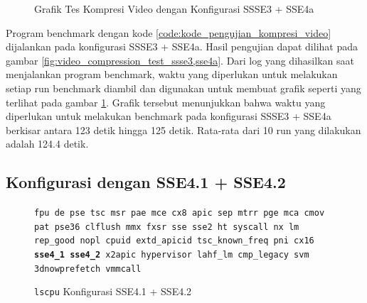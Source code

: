 \begin{figure}
    \centering
    \caption{Grafik Tes Kompresi Video dengan Konfigurasi SSSE3 + SSE4a}
    \label{fig:video_compression_test_ssse3,sse4a_graph}
\end{figure}

Program benchmark dengan kode \ref{code:kode_pengujian_kompresi_video} dijalankan pada konfigurasi SSSE3 + SSE4a. Hasil pengujian dapat dilihat pada gambar \ref{fig:video_compression_test_ssse3,sse4a}. Dari log yang dihasilkan saat menjalankan program benchmark, waktu yang diperlukan untuk melakukan setiap run benchmark diambil dan digunakan untuk membuat grafik seperti yang terlihat pada gambar \ref{fig:video_compression_test_ssse3,sse4a_graph}. Grafik tersebut menunjukkan bahwa waktu yang diperlukan untuk melakukan benchmark pada konfigurasi SSSE3 + SSE4a berkisar antara 123 detik hingga 125 detik. Rata-rata dari 10 run yang dilakukan adalah 124.4 detik.

\subsection{Konfigurasi dengan SSE4.1 + SSE4.2}
\begin{figure}
    \texttt{fpu de pse tsc msr pae mce cx8 apic sep mtrr pge mca cmov pat pse36 clflush mmx fxsr sse sse2 ht syscall nx lm rep\_good nopl cpuid extd\_apicid tsc\_known\_freq pni cx16 \textbf{sse4\_1} \textbf{sse4\_2} x2apic hypervisor lahf\_lm cmp\_legacy svm 3dnowprefetch vmmcall}
    \caption{\texttt{lscpu} Konfigurasi SSE4.1 + SSE4.2}
    \label{fig:lscpu_video_compression_test_sse4.1,sse4.2}
\end{figure}

